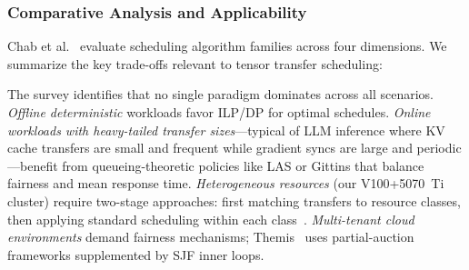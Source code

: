 \documentclass[11pt,letterpaper]{article}
\theoremstyle{definition}
\begin{document}
\subsubsection{Comparative Analysis and Applicability}

Chab et al.~\cite{gpu-scheduling-survey} evaluate scheduling algorithm families across four dimensions. We summarize the key trade-offs relevant to tensor transfer scheduling:

\begin{table}[htbp]
\centering
\caption{Comparative analysis of GPU scheduling algorithm families~\cite{gpu-scheduling-survey} and their applicability to RDMA tensor scheduling}
\label{tab:scheduling-comparison}
\footnotesize
{}
\end{table}

The survey identifies that no single paradigm dominates across all scenarios. \emph{Offline deterministic} workloads favor ILP/DP for optimal schedules. \emph{Online workloads with heavy-tailed transfer sizes}---typical of LLM inference where KV cache transfers are small and frequent while gradient syncs are large and periodic---benefit from queueing-theoretic policies like LAS or Gittins that balance fairness and mean response time. \emph{Heterogeneous resources} (our V100+5070~Ti cluster) require two-stage approaches: first matching transfers to resource classes, then applying standard scheduling within each class~\cite{gavel2020}. \emph{Multi-tenant cloud environments} demand fairness mechanisms; Themis~\cite{themis2020} uses partial-auction frameworks supplemented by SJF inner loops.
\end{document}

